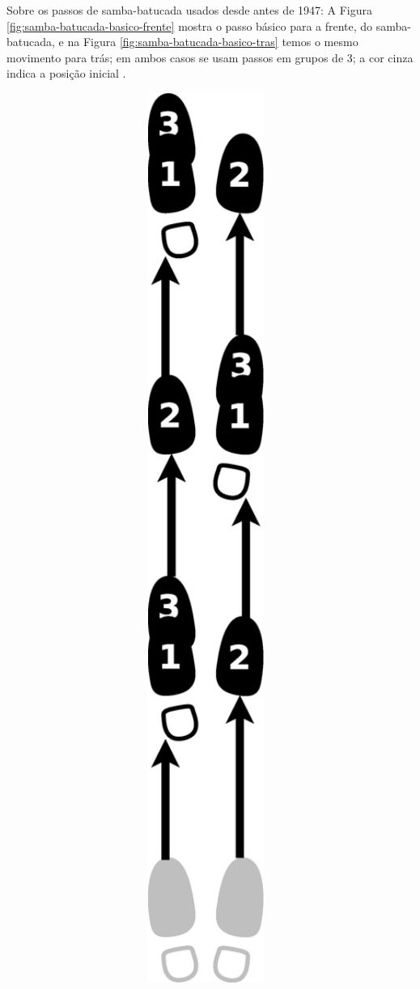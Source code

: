 \begin{itemize}
Sobre os passos de samba-batucada usados desde antes de 1947: 
A Figura \ref{fig:samba-batucada-basico-frente}  mostra o passo básico para a 
frente, do samba-batucada, 
e na  Figura \ref{fig:samba-batucada-basico-tras} temos o mesmo movimento para trás;
em ambos casos se usam passos em grupos de 3; a cor cinza indica a posição inicial \cite[pp. 61-62]{fornaciari1947aprender} \cite[pp. 63]{freitas1959danca}. 
\begin{figure}[h]
    \centering
    \begin{subfigure}[b]{0.65\textwidth}
        \centering
        \includegraphics[angle=270,width=0.97\textwidth]{chapters/cap-historia-sambagafieira/samba-batucada-basico-frente.eps}

\end{subfigure}
\end{figure}
\end{itemize}
